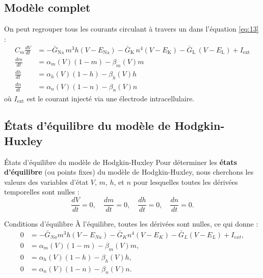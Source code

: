 \documentclass[10pt,french]{beamer}
\begin{document}
\subsection{Modèle complet}
	\begin{frame}    
		On peut regrouper tous les courants circulant à travers un dans l'équation \eqref{eq:13} :
		\begin{align}
			C_m \frac{dV}{dt} &= -\bar{G}_{\text{Na}}\, m^3 h (V - E_{\text{Na}})
			-\bar{G}_{\text{K}}\, n^4 (V - E_{\text{K}})
			-\bar{G}_{\text{L}}\, (V - E_{\text{L}})
			+ I_{\text{ext}} 
			\label{eq:13} \\
			\frac{dm}{dt} &= \alpha_m(V)(1 - m) - \beta_m(V) m \label{eq:14}\\
			\frac{dh}{dt} &= \alpha_h(V)(1 - h) - \beta_h(V) h \label{eq:15}\\
			\frac{dn}{dt} &= \alpha_n(V)(1 - n) - \beta_n(V) n \label{eq:16}
		\end{align}
		où $I_{\text{ext}}$ est le courant injecté via une électrode intracellulaire.
	\end{frame}
	
	\subsection{États d'équilibre du modèle de Hodgkin-Huxley}
	\begin{frame}{États d'équilibre du modèle de Hodgkin-Huxley}
		Pour déterminer les \textbf{états d'équilibre} (ou points fixes) du modèle de Hodgkin-Huxley, nous cherchons les valeurs des variables d'état \( V \), \( m \), \( h \), et \( n \) pour lesquelles toutes les dérivées temporelles sont nulles :
		\[
		\frac{dV}{dt} = 0, \quad \frac{dm}{dt} = 0, \quad \frac{dh}{dt} = 0, \quad \frac{dn}{dt} = 0.
		\]
	\end{frame}
	
	\begin{frame}{Conditions d'équilibre}
		À l'équilibre, toutes les dérivées sont nulles, ce qui donne :
		\begin{align*}
			0 &= -\bar{G}_{Na} m^3 h (V - E_{Na}) - \bar{G}_K n^4 (V - E_K) - \bar{G}_L (V - E_L) + I_{ext}, \\
			0 &= \alpha_m(V) (1 - m) - \beta_m(V) m, \\
			0 &= \alpha_h(V) (1 - h) - \beta_h(V) h, \\
			0 &= \alpha_n(V) (1 - n) - \beta_n(V) n.
		\end{align*}
	\end{frame}
	
\end{document}
